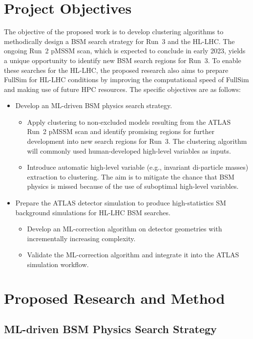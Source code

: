 \documentclass[letter, USenglish, 11pt, subfigure]{article}
\begin{document}
\section{Project Objectives}
The objective of the proposed work is to develop clustering algorithms to methodically design a BSM search strategy for Run~3 and the HL-LHC. The ongoing Run~2 pMSSM scan, which is expected to conclude in early 2023, yields a unique opportunity to identify new BSM search regions for Run~3. To enable these searches for the HL-LHC, the proposed research also aims to prepare FullSim for HL-LHC conditions by improving the computational speed of FullSim and making use of future HPC resources. The specific objectives are as follows:
\begin{itemize}
\item Develop an ML-driven BSM physics search strategy.
  \begin{itemize}
  \item Apply clustering to non-excluded models resulting from the ATLAS Run~2 pMSSM scan and identify promising regions for further development into new search regions for Run~3. The clustering algorithm will commonly used human-developed high-level variables as inputs. 
  \item Introduce automatic high-level variable (e.g., invariant di-particle masses) extraction to clustering. The aim is to mitigate the chance that BSM physics is missed because of the use of suboptimal high-level variables. %
  \end{itemize}
\item Prepare the ATLAS detector simulation to produce high-statistics SM background simulations for HL-LHC BSM searches.
  \begin{itemize}
  \item Develop an ML-correction algorithm on detector geometries with incrementally increasing complexity.
  \item Validate the ML-correction algorithm and integrate it into the ATLAS simulation workflow.
  \end{itemize}
\end{itemize}

\section{Proposed Research and Method}

\subsection{ML-driven BSM Physics Search Strategy}
\end{document}
